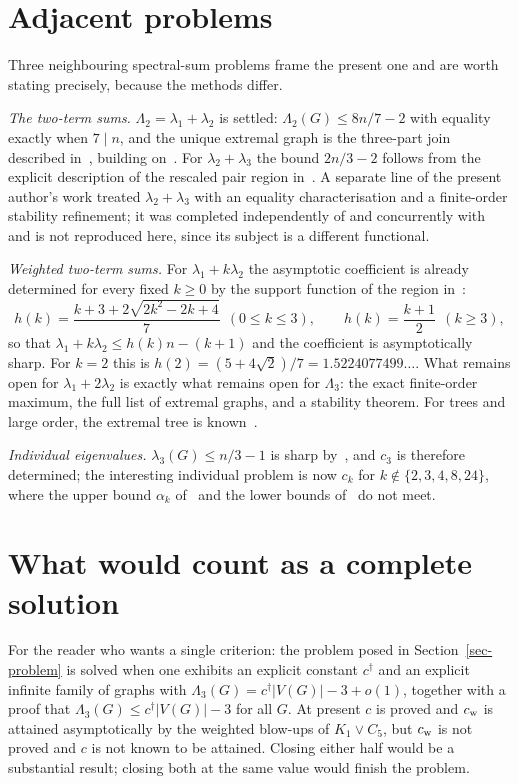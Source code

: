 \section{Adjacent problems}\label{sec-adjacent}
Three neighbouring spectral-sum problems frame the present one and are worth
stating precisely, because the methods differ.

\emph{The two-term sums.} $\Lambda_2=\lambda_1+\lambda_2$ is settled:
$\Lambda_2(G)\le8n/7-2$ with equality exactly when $7\mid n$, and the unique
extremal graph is the three-part join described in~\cite{HW}, building
on~\cite{KLMPT}. For $\lambda_2+\lambda_3$ the bound $2n/3-2$ follows from the
explicit description of the rescaled pair region in~\cite{Paulin}. A separate
line of the present author's work treated $\lambda_2+\lambda_3$ with an
equality characterisation and a finite-order stability refinement; it was
completed independently of and concurrently with~\cite{Paulin} and is not
reproduced here, since its subject is a different functional.

\emph{Weighted two-term sums.} For $\lambda_1+k\lambda_2$ the asymptotic
coefficient is already determined for every fixed $k\ge0$ by the support
function of the region in~\cite{Paulin}:
\[
 h(k)=\frac{k+3+2\sqrt{2k^2-2k+4}}7\ \ (0\le k\le3),
 \qquad h(k)=\frac{k+1}2\ \ (k\ge3),
\]
so that $\lambda_1+k\lambda_2\le h(k)n-(k+1)$ and the coefficient is
asymptotically sharp. For $k=2$ this is
$h(2)=(5+4\sqrt2)/7=1.5224077499\ldots$. What remains open for
$\lambda_1+2\lambda_2$ is exactly what remains open for $\Lambda_3$: the exact
finite-order maximum, the full list of extremal graphs, and a stability
theorem. For trees and large order, the extremal tree is known~\cite{KMMZ}.

\emph{Individual eigenvalues.} $\lambda_3(G)\le n/3-1$ is sharp
by~\cite{STW}, and $c_3$ is therefore determined; the interesting individual
problem is now $c_k$ for $k\notin\{2,3,4,8,24\}$, where the upper bound
$\alpha_k$ of~\cite{STW} and the lower bounds of~\cite{Linz} do not meet.

\section{What would count as a complete solution}
For the reader who wants a single criterion: the problem posed in
Section~\ref{sec-problem} is solved when one exhibits an explicit constant
$c^\dagger$ and an explicit infinite family of graphs with
$\Lambda_3(G)=c^\dagger|V(G)|-3+o(1)$, together with a proof that
$\Lambda_3(G)\le c^\dagger|V(G)|-3$ for all $G$. At present $c$ is proved and
$c_{\mathrm{w}}$ is attained asymptotically by the weighted blow-ups of $K_1\vee C_5$,
but $c_{\mathrm{w}}$ is not proved and $c$ is not known to be attained. Closing either
half would be a substantial result; closing both at the same value would
finish the problem.
